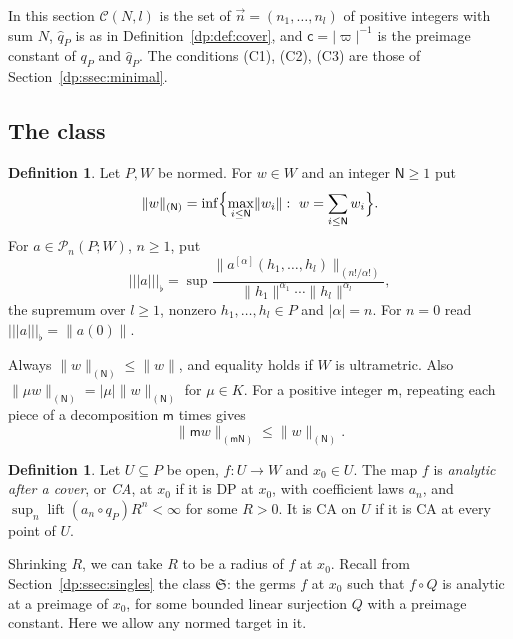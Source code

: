\documentclass[11pt]{amsart}
\theoremstyle{definition}
\newtheorem{definition}[theorem]{Definition}
\theoremstyle{remark}
\numberwithin{equation}{section}
\newcommand{\abs}[1]{\lvert #1\rvert}
\newcommand{\norm}[1]{\lVert #1\rVert}
\theoremstyle{plain}
\theoremstyle{definition}
\theoremstyle{plain}
\newcommand{\cP}{\mathcal P}
\begin{document}
In this section $\mathcal C(N,l)$ is the set of $\vec n=(n_1,\dots,n_l)$ of positive integers with sum $N$, $\hat q_P$ is as in Definition~\ref{dp:def:cover}, and $\mathsf c=\abs\varpi^{-1}$ is the preimage constant of $q_P$ and $\hat q_P$. The conditions (C1), (C2), (C3) are those of Section~\ref{dp:ssec:minimal}.

\subsection{The class}\label{dp:ssec:ca-class}

\begin{definition}\label{dp:def:flat}
Let $P,W$ be normed. For $w\in W$ and an integer $\mathsf N\ge1$ put
\[
 \norm w_{(\mathsf N)}=\inf\Bigl\{\max_{i\le\mathsf N}\norm{w_i}:\ w=\sum_{i\le\mathsf N}w_i\Bigr\}.
\]
For $a\in\cP_n(P;W)$, $n\ge1$, put
\[
 \lvert\!\lvert\!\lvert a\rvert\!\rvert\!\rvert_\flat=\sup\frac{\norm{a^{[\alpha]}(h_1,\dots,h_l)}_{(n!/\alpha!)}}{\norm{h_1}^{\alpha_1}\cdots\norm{h_l}^{\alpha_l}},
\]
the supremum over $l\ge1$, nonzero $h_1,\dots,h_l\in P$ and $\abs\alpha=n$. For $n=0$ read $\lvert\!\lvert\!\lvert a\rvert\!\rvert\!\rvert_\flat=\norm{a(0)}$.
\end{definition}

Always $\norm w_{(\mathsf N)}\le\norm w$, and equality holds if $W$ is ultrametric. Also $\norm{\mu w}_{(\mathsf N)}=\abs\mu\norm w_{(\mathsf N)}$ for $\mu\in K$. For a positive integer $\mathsf m$, repeating each piece of a decomposition $\mathsf m$ times gives
\begin{equation}\label{dp:eq:ca-repeat}
 \norm{\mathsf m w}_{(\mathsf m\mathsf N)}\le\norm w_{(\mathsf N)}.
\end{equation}

\begin{definition}\label{dp:def:ca}
Let $U\subseteq P$ be open, $f\colon U\to W$ and $x_0\in U$. The map $f$ is \emph{analytic after a cover}, or \emph{CA}, at $x_0$ if it is DP at $x_0$, with coefficient laws $a_n$, and $\sup_n\operatorname{lift}(a_n\circ q_P)R^n<\infty$ for some $R>0$. It is CA on $U$ if it is CA at every point of $U$.
\end{definition}

Shrinking $R$, we can take $R$ to be a radius of $f$ at $x_0$. Recall from Section~\ref{dp:ssec:singles} the class $\mathfrak S$: the germs $f$ at $x_0$ such that $f\circ Q$ is analytic at a preimage of $x_0$, for some bounded linear surjection $Q$ with a preimage constant. Here we allow any normed target in it.
\end{document}
